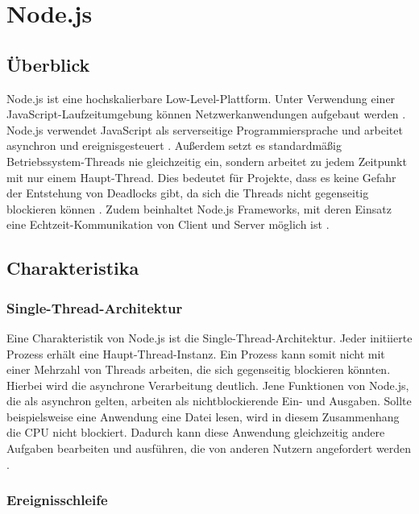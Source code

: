 \chapter{Node.js}\label{node}

\section{Überblick}
Node.js ist eine hochskalierbare Low-Level-Plattform. Unter Verwendung einer JavaScript-Laufzeitumgebung können Netzwerkanwendungen aufgebaut werden \cite[S.1]{neins}. Node.js verwendet JavaScript als serverseitige Programmiersprache \cite[S.3]{neins} und arbeitet asynchron und ereignisgesteuert \cite{nzwei}. 
Außerdem setzt es standardmäßig Betriebssystem-Threads nie gleichzeitig ein, sondern arbeitet zu jedem Zeitpunkt mit nur einem Haupt-Thread. Dies bedeutet für Projekte, dass es keine Gefahr der Entstehung von Deadlocks gibt, da sich die Threads nicht gegenseitig blockieren können \cite{nzwei}. Zudem beinhaltet Node.js Frameworks, mit deren Einsatz eine Echtzeit-Kommunikation von Client und Server möglich ist \cite[S.3]{neins}.

\section{Charakteristika}

\subsection{Single-Thread-Architektur}
Eine Charakteristik von Node.js ist die Single-Thread-Architektur. Jeder initiierte Prozess erhält eine Haupt-Thread-Instanz. Ein Prozess kann somit nicht mit einer Mehrzahl von Threads arbeiten, die sich gegenseitig blockieren könnten. 
Hierbei wird die asynchrone Verarbeitung deutlich. Jene Funktionen von Node.js, die als asynchron gelten, arbeiten als nichtblockierende Ein- und Ausgaben. Sollte beispielsweise eine Anwendung eine Datei lesen, wird in diesem Zusammenhang die CPU nicht blockiert. Dadurch kann diese Anwendung gleichzeitig andere Aufgaben bearbeiten und ausführen, die von anderen Nutzern angefordert werden \cite[S.1]{neins}.

\subsection{Ereignisschleife}

